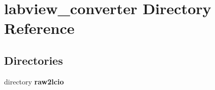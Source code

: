\section{labview\-\_\-converter Directory Reference}
\label{dir_80bba41d90a271dbef7fc68fc065efc7}
\subsection*{Directories}
\begin{DoxyCompactItemize}
\item 
directory {\bf raw2lcio}
\end{DoxyCompactItemize}
